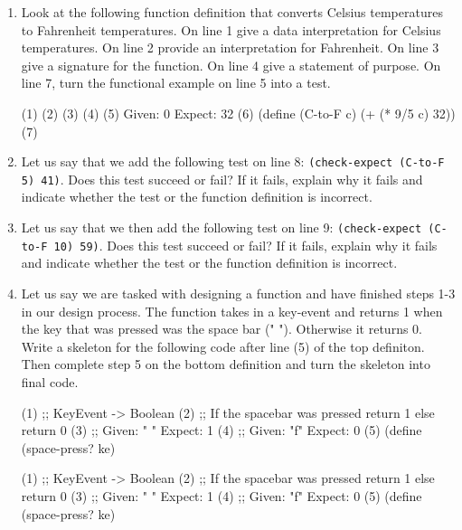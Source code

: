 \documentclass[11pt]{article}
\newcommand{\prog}[1]{\texttt{#1}}
\begin{document}
  \begin{enumerate}

  \item Look at the following function definition that converts
    Celsius temperatures to Fahrenheit temperatures. On line 1
    give a data interpretation for Celsius temperatures. On line 2
    provide an interpretation for Fahrenheit. On line 3 give a signature
    for the function. On line 4 give a statement of purpose. On line 7,
    turn the functional example on line 5 into a test.
    \begin{program}
      (1)
      (2)
      (3)
      (4)
      (5) Given: 0 Expect: 32
      (6) (define (C-to-F c) (+ (* 9/5 c) 32))
      (7)
    \end{program}

  \item Let us say that we add the following test on line 8:
    \prog{(check-expect (C-to-F 5) 41)}. Does this test succeed or fail?
     If it fails, explain why it fails and indicate whether the test or the function definition is incorrect.

  \item Let us say that we then add the following test on line 9:
    \prog{(check-expect (C-to-F 10) 59)}. Does this test succeed or fail?
    If it fails, explain why it fails and indicate whether the test  or 
    the function definition is incorrect.

  \item Let us say we are tasked with designing a function and have finished
    steps 1-3 in our design process. The function takes in a key-event and
    returns 1 when the key that was pressed was the space bar (" "). Otherwise
    it returns 0. Write a skeleton for the following code after line (5)
    of the top definiton. Then complete step 5 on the bottom definition and
    turn the skeleton into final code.

    \begin{program}
      (1) ;; KeyEvent -> Boolean
      (2) ;; If the spacebar was pressed return 1 else return 0
      (3) ;; Given: " " Expect: 1
      (4) ;; Given: "f" Expect: 0
      (5) (define (space-press? ke)





      
    \end{program}

    \begin{program}
      (1) ;; KeyEvent -> Boolean
      (2) ;; If the spacebar was pressed return 1 else return 0
      (3) ;; Given: " " Expect: 1
      (4) ;; Given: "f" Expect: 0
      (5) (define (space-press? ke)





      
    \end{program}

  \end{enumerate}
\end{document}
